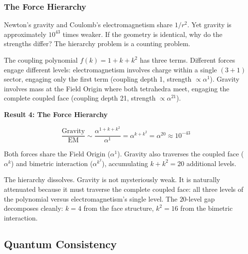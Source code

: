\documentclass[aps,prd,preprint,superscriptaddress,showpacs,preprintnumbers,amsmath,amssymb,nofootinbib]{revtex4-2}
\begin{document}
\subsubsection*{The Force Hierarchy}

Newton's gravity and Coulomb's electromagnetism share $1/r^2$. Yet gravity is approximately $10^{43}$ times weaker. If the geometry is identical, why do the strengths differ? The hierarchy problem is a counting problem.

The coupling polynomial $f(k) = 1 + k + k^2$ has three terms. Different forces engage different levels: electromagnetism involves charge within a single $(3{+}1)$ sector, engaging only the first term (coupling depth 1, strength $\propto \alpha^1$). Gravity involves mass at the Field Origin where both tetrahedra meet, engaging the complete coupled face (coupling depth 21, strength $\propto \alpha^{21}$).

\vspace{1.5em}
\noindent
\colorbox{resultgreen}{\parbox{\dimexpr\textwidth-2\fboxsep\relax}{%
\vspace{0.8em}
\centering
\textbf{\large Result 4: The Force Hierarchy}

\vspace{0.5em}
\boldmath
\begin{equation}
\frac{\text{Gravity}}{\text{EM}} \sim \frac{\alpha^{1+k+k^2}}{\alpha^{1}} = \alpha^{k+k^2} = \alpha^{20} \approx 10^{-43}
\label{eq:force-hierarchy}
\end{equation}
\unboldmath

\vspace{0.3em}
Both forces share the Field Origin ($\alpha^1$). Gravity also traverses the coupled face ($\alpha^k$) and bimetric interaction ($\alpha^{k^2}$), accumulating $k + k^2 = 20$ additional levels.
\vspace{0.5em}
}}
\vspace{1cm}

The hierarchy dissolves. Gravity is not mysteriously weak. It is naturally attenuated because it must traverse the complete coupled face: all three levels of the polynomial versus electromagnetism's single level. The $20$-level gap decomposes cleanly: $k = 4$ from the face structure, $k^2 = 16$ from the bimetric interaction.

\subsection{Quantum Consistency}
\label{subsec:quantum}
\end{document}
